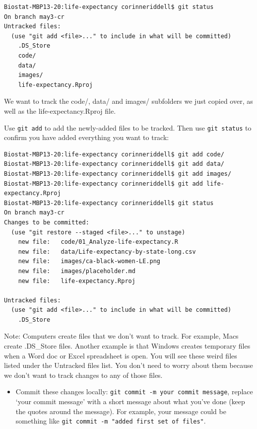 \documentclass[
]{book}
\providecommand{\tightlist}{%
  \setlength{\itemsep}{0pt}\setlength{\parskip}{0pt}}
\begin{document}
\begin{verbatim}
Biostat-MBP13-20:life-expectancy corinneriddell$ git status
On branch may3-cr
Untracked files:
  (use "git add <file>..." to include in what will be committed)
    .DS_Store
    code/
    data/
    images/
    life-expectancy.Rproj
\end{verbatim}

We want to track the code/, data/ and images/ subfolders we just copied over, as
well as the life-expectancy.Rproj file.

Use \texttt{git\ add} to add the newly-added files to be tracked. Then use \texttt{git\ status}
to confirm you have added everything you want to track:

\begin{verbatim}
Biostat-MBP13-20:life-expectancy corinneriddell$ git add code/
Biostat-MBP13-20:life-expectancy corinneriddell$ git add data/
Biostat-MBP13-20:life-expectancy corinneriddell$ git add images/
Biostat-MBP13-20:life-expectancy corinneriddell$ git add life-expectancy.Rproj 
Biostat-MBP13-20:life-expectancy corinneriddell$ git status
On branch may3-cr
Changes to be committed:
  (use "git restore --staged <file>..." to unstage)
    new file:   code/01_Analyze-life-expectancy.R
    new file:   data/Life-expectancy-by-state-long.csv
    new file:   images/ca-black-women-LE.png
    new file:   images/placeholder.md
    new file:   life-expectancy.Rproj

Untracked files:
  (use "git add <file>..." to include in what will be committed)
    .DS_Store
\end{verbatim}

Note: Computers create files that we don't want to track. For example, Macs create
.DS\_Store files. Another example is that Windows creates temporary files when a Word
doc or Excel spreadsheet is open. You will see these weird files listed under the
Untracked files list. You don't need to worry about them because we don't want
to track changes to any of those files.

\begin{itemize}
\tightlist
\item
  Commit these changes locally: \texttt{git\ commit\ -m\ \textquotesingle{}your\ commit\ message\textquotesingle{}}, replace
  `your commit message' with a short message about what you've done (keep the
  quotes around the message). For example, your message could be something like
  \texttt{git\ commit\ -m\ "added\ first\ set\ of\ files"}.
\end{itemize}
\end{document}
